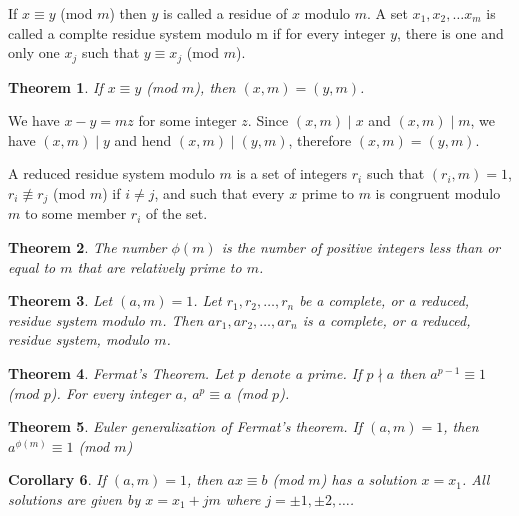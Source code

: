 \documentclass[11pt]{article} %
\newtheorem{theorem}{Theorem}[section]
\newtheorem{corollary}[theorem]{Corollary}
\newenvironment{proof}[1][Proof]{\begin{trivlist}
\item[\hskip \labelsep {\bfseries #1}]}{\end{trivlist}}
\newenvironment{definition}[1][Definition]{\begin{trivlist}
\item[\hskip \labelsep {\bfseries #1}]}{\end{trivlist}}
\begin{document}
\begin{definition}
	If $x \equiv y$ (mod $m$) then $y$ is called a residue of $x$ modulo $m$. A set $x_1, x_2, \ldots x_m$ is called a complte residue system modulo m  if for every integer $y$, there is one and only one $x_j$ such that $y \equiv x_j$ (mod $m$). 
\end{definition}

\begin{theorem}
	If $x \equiv y$ (mod $m$), then $(x, m) = (y, m)$. 
\end{theorem}

\begin{proof}
	We have $x - y = mz$ for some integer $z$. Since $(x, m) \mid x$ and $(x, m) \mid m$, we have $(x, m) \mid y$ and hend $(x, m) \mid (y, m)$, therefore $(x, m) = (y, m)$. 
\end{proof}

\begin{definition}
	A reduced residue system modulo $m$ is a set of integers $r_i$ such that $(r_i, m) =  1$, $r_i \not\equiv r_j$ (mod $m$) if $i \neq j$, and such that every $x$ prime to $m$ is congruent modulo $m$ to some member $r_i$ of the set. 
\end{definition}

\begin{theorem}
	The number $\phi(m)$ is the number of positive integers less than or equal to $m$ that are relatively prime to $m$. 
\end{theorem}

\begin{theorem}
	Let $(a, m) = 1$. Let $r_1, r_2, \ldots, r_n$ be a complete, or a reduced, residue system modulo $m$. Then $ar_1, ar_2, \ldots, ar_n$ is a complete, or a reduced, residue system, modulo $m$. 
\end{theorem}

\begin{theorem}
	Fermat's Theorem. Let $p$ denote a prime. If $p \nmid a$ then $a^{p - 1} \equiv 1$ (mod $p$). For every integer $a$, $a^p \equiv a$ (mod $p$). 
\end{theorem}

\begin{theorem}
	Euler generalization of Fermat's theorem. If $(a, m) = 1$, then 
	{\center
		$a^{\phi(m)} \equiv 1$ (mod $m$) \\
	}
\end{theorem}

\begin{corollary}
	If $(a, m) = 1$, then $ax \equiv b$ (mod $m$) has a solution $x = x_1$. All solutions are given by $x = x_1 + jm$ where $j = \pm1, \pm2, \ldots$. 
\end{corollary}
\end{document}
